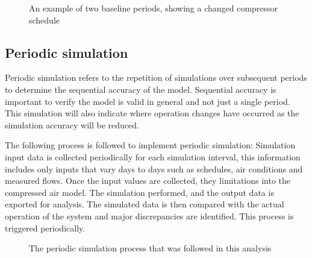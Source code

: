 		\begin{figure}[h]
			\centering
			\fbox{}
			\caption{An example of two baseline periods, showing a changed compressor schedule}
			\label{fig: Compressor schedule}
		\end{figure}
	\subsection{Periodic simulation}	
		Periodic simulation refers to the repetition of simulations over subsequent periods to determine the sequential accuracy of the model. Sequential accuracy is important to verify the model is valid in general and not just a single period. This simulation will also indicate where operation changes have occurred as the simulation accuracy will be reduced.
		\par 
		The following process is followed to implement periodic simulation: Simulation input data is collected periodically for each simulation interval, this information includes only inputs that vary days to days such as schedules, air conditions and measured flows. Once the input values are collected, they limitations into the compressed air model. The simulation performed, and the output data is exported for analysis. The simulated data is then compared with the actual operation of the system and major discrepancies are identified. This process is triggered periodically.
		\begin{figure}[h]
			\centering
			\caption{The periodic simulation process that was followed in this analysis}
			\label{fig: PeriodicProcess}
		\end{figure}
	
